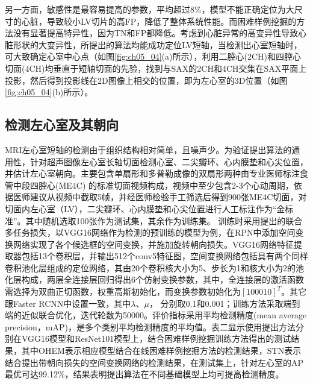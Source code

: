 另一方面，敏感性是最容易提高的参数，平均超过8\%，模型不能正确定位为大尺寸的心脏，导致较小LV切片的高FP，降低了整体系统性能。而困难样例挖掘的方法没有显著提高特异性，因为TN和FP都降低。考虑到心脏异常的高变异性导致心脏形状的大变异性，所提出的算法均能成功定位LV短轴，当检测出心室短轴时，可大致确定心室中心点（如图\ref{fig:ch05_04}(a)所示），利用二腔心(2CH)和四腔心切面(4CH)均垂直于短轴切面的先验，找到与SAX的2CH和4CH交集在SAX平面上投影，然后得到投影线在2D图像上相交的位置，即为左心室的3D位置（如图\ref{fig:ch05_04}(b)所示）。

\subsection{检测左心室及其朝向}

MRI左心室短轴的检测由于组织结构相对简单，且噪声少。为验证提出算法的通用性，针对超声图像左心室长轴切面检测心室、二尖瓣环、心内膜垫和心尖位置，并估计左心室朝向。主要包含单扇形和多普勒成像的双扇形两种由专业医师标注食管中段四腔心(ME4C) 的标准切面视频构成，视频中至少包含2-3个心动周期，依据医师建议从视频中截取5帧，并经医师检验手工筛选后得到900张ME4C切面，对切面内左心室（LV），二尖瓣环、心内膜垫和心尖位置进行人工标注作为“金标准”。其中随机选取100张作为测试集，其余作为训练集。
训练时采用提出的联合多任务损失，以VGG16网络作为检测的预训练的模型为例，在RPN中添加空间变换网络实现了各个候选框的空间变换，并施加旋转朝向损失。VGG16网络特征提取器包括13个卷积层，并输出512个conv5特征图，空间变换网络包括具有两个同样卷积池化层组成的定位网络，其由20个卷积核大小为5、步长为1和核大小为2的池化层构成，两层全连接层回归得出6个仿射变换参数，其中，全连接层的激活函数需选择为双曲正切函数，权重高斯初始化，而变换参数初始化为$[1 0 0 0 1 0]^T$。其它跟Faster RCNN中设置一致，其中$\lambda$、$\mu$， 分别取0.1和0.001；训练方法采取端到端的近似联合优化，迭代轮数为50000。评价指标采用平均检测精度(mean average precision，mAP)，是多个类别平均检测精度的平均值。表二显示使用提出方法分别在VGG16模型和ResNet101模型上，结合困难样例挖掘训练方法得出的测试结果，其中OHEM表示相应模型结合在线困难样例挖掘方法的检测结果，STN表示结合提出带朝向损失的空间变换网络的检测结果，在测试集上，针对左心室的AP最优可达99.12\%，结果表明提出算法在不同基础模型上均可提高检测精度。

